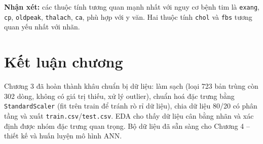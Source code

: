 \textbf{Nhận xét:} các thuộc tính tương quan mạnh nhất với nguy cơ bệnh tim là
\texttt{exang}, \texttt{cp}, \texttt{oldpeak}, \texttt{thalach}, \texttt{ca},
phù hợp với y văn. Hai thuộc tính \texttt{chol} và \texttt{fbs} tương quan yếu
nhất với nhãn.

\section{Kết luận chương}
Chương 3 đã hoàn thành khâu chuẩn bị dữ liệu: làm sạch (loại 723 bản trùng còn
302 dòng, không có giá trị thiếu, xử lý outlier), chuẩn hoá đặc trưng bằng
\texttt{StandardScaler} (fit trên train để tránh rò rỉ dữ liệu), chia dữ liệu
80/20 có phân tầng và xuất \texttt{train.csv}/\texttt{test.csv}. EDA cho thấy dữ
liệu cân bằng nhãn và xác định được nhóm đặc trưng quan trọng. Bộ dữ liệu đã sẵn
sàng cho Chương 4 -- thiết kế và huấn luyện mô hình ANN.
